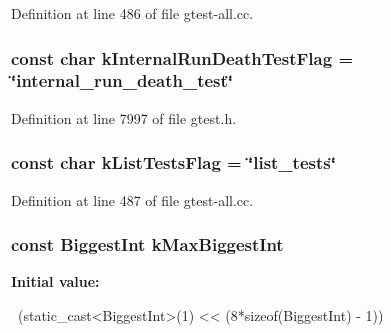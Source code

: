 \-Definition at line 486 of file gtest-\/all.\-cc.

\hypertarget{namespacetesting_1_1internal_a29105b980c57e381b8f5ce94122829e3}{
\subsubsection[{k\-Internal\-Run\-Death\-Test\-Flag}]{\setlength{\rightskip}{0pt plus 5cm}const char {\bf k\-Internal\-Run\-Death\-Test\-Flag} = \char`\"{}internal\-\_\-run\-\_\-death\-\_\-test\char`\"{}}}\label{d0/da7/namespacetesting_1_1internal_a29105b980c57e381b8f5ce94122829e3}


\-Definition at line 7997 of file gtest.\-h.

\hypertarget{namespacetesting_1_1internal_ae3a6eeb3de16a5f69f3bc0568c8e9da0}{
\subsubsection[{k\-List\-Tests\-Flag}]{\setlength{\rightskip}{0pt plus 5cm}const char {\bf k\-List\-Tests\-Flag} = \char`\"{}list\-\_\-tests\char`\"{}}}\label{d0/da7/namespacetesting_1_1internal_ae3a6eeb3de16a5f69f3bc0568c8e9da0}


\-Definition at line 487 of file gtest-\/all.\-cc.

\hypertarget{namespacetesting_1_1internal_af6e12b00ae1205c169d790d2ddd6724d}{
\subsubsection[{k\-Max\-Biggest\-Int}]{\setlength{\rightskip}{0pt plus 5cm}const {\bf \-Biggest\-Int} {\bf k\-Max\-Biggest\-Int}}}\label{d0/da7/namespacetesting_1_1internal_af6e12b00ae1205c169d790d2ddd6724d}
{\bfseries \-Initial value\-:}
\begin{DoxyCode}

    ~(static_cast<BiggestInt>(1) << (8*sizeof(BiggestInt) - 1))
\end{DoxyCode}


